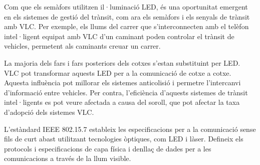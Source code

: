 Com que els semàfors utilitzen il·luminació LED, és una oportunitat emergent en els sistemes de gestió del trànsit, com ara els semàfors i els senyals de trànsit amb VLC. Per exemple, els llums del carrer que s'interconnecten amb el telèfon intel·ligent equipat amb VLC d'un caminant poden controlar el trànsit de vehicles, permetent als caminants creuar un carrer.

La majoria dels fars i fars posteriors dels cotxes s'estan substituint per LED. VLC pot transformar aquests LED per a la comunicació de cotxe a cotxe. Aquesta influència pot millorar els sistemes anticolisió i permetre l'intercanvi d'informació entre vehicles. Per contra, l'eficiència d'aquests sistemes de trànsit intel·ligents es pot veure afectada a causa del soroll, que pot afectar la taxa d'adopció dels sistemes VLC.

L'estàndard IEEE 802.15.7 estableix les especificacions per a la comunicació sense fils de curt abast utilitzant tecnologies òptiques, com LED i làser. Defineix els protocols i especificacions de capa física i denllaç de dades per a les comunicacions a través de la llum visible.